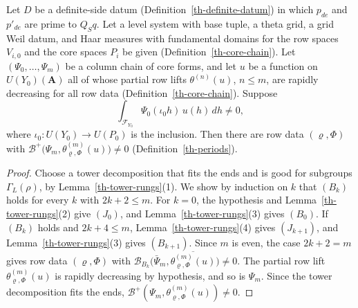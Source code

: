\begin{theorem}\label{th-bessel-ascent}
Let $D$ be a definite-side datum (Definition~\ref{th-definite-datum}) in which
$p_{de}$ and $p'_{de}$ are prime to $Q_Sq$. Let a level system with base tuple,
a theta grid, a grid Weil datum, and Haar measures with fundamental domains for
the row spaces $V_{i,0}$ and the core spaces $P_i$ be given
(Definition~\ref{th-core-chain}). Let $(\Psi_0,\ldots,\Psi_m)$ be a column
chain of core forms, and let $u$ be a function on $U(Y_0)(\mathbf A)$ all of
whose partial row lifts $\theta^{(n)}(u)$, $n\leq m$, are rapidly decreasing
for all row data (Definition~\ref{th-core-chain}). Suppose
\[
\int_{\mathcal F_{Y_0}}\Psi_0(\iota_0h)\,u(h)\,dh\neq0,
\]
where $\iota_0\colon U(Y_0)\to U(P_0)$ is the inclusion. Then there are row
data $(\varrho,\Phi)$ with
$\mathcal B^+\bigl(\Psi_m,\theta^{(m)}_{\varrho,\Phi}(u)\bigr)\neq0$
(Definition~\ref{th-periods}).
\end{theorem}
\begin{proof}
Choose a tower decomposition that fits the ends and is good for subgroups
$\Gamma_L(\rho)$, by Lemma~\ref{th-tower-rungs}(1). We show by induction on $k$
that $(B_k)$ holds for every $k$ with $2k+2\leq m$. For $k=0$, the hypothesis
and Lemma~\ref{th-tower-rungs}(2) give $(J_0)$, and
Lemma~\ref{th-tower-rungs}(3) gives $(B_0)$. If $(B_k)$ holds and
$2k+4\leq m$, Lemma~\ref{th-tower-rungs}(4) gives $(J_{k+1})$, and
Lemma~\ref{th-tower-rungs}(3) gives $(B_{k+1})$. Since $m$ is even, the case
$2k+2=m$ gives row data $(\varrho,\Phi)$ with
$\mathcal B_{B_k}\bigl(\bar\Psi_m,\overline{\theta^{(m)}_{\varrho,\Phi}(u)}\bigr)\neq0$.
The partial row lift $\theta^{(m)}_{\varrho,\Phi}(u)$ is rapidly decreasing by
hypothesis, and so is $\Psi_m$. Since the tower decomposition fits the ends,
$\mathcal B^+(\Psi_m,\theta^{(m)}_{\varrho,\Phi}(u))\neq0$.
\end{proof}

